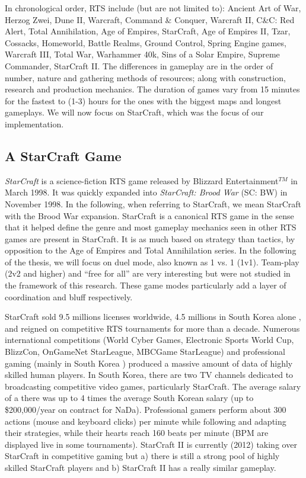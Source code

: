 In chronological order, RTS include (but are not limited to): Ancient Art of War, Herzog Zwei, Dune II, Warcraft, Command \& Conquer, Warcraft II, C\&C: Red Alert, Total Annihilation, Age of Empires, StarCraft, Age of Empires II, Tzar, Cossacks, Homeworld, Battle Realms, Ground Control, Spring Engine games, Warcraft III, Total War, Warhammer 40k, Sins of a Solar Empire, Supreme Commander, StarCraft II. The differences in gameplay are in the order of number, nature and gathering methods of resources; along with construction, research and production mechanics. The duration of games vary from 15 minutes for the fastest to (1-3) hours for the ones with the biggest maps and longest gameplays. We will now focus on StarCraft, which was the focus of our implementation.


\subsection{A StarCraft Game}
\textit{StarCraft} is a science-fiction RTS game released by Blizzard Entertainment$^{TM}$ in March 1998. It was quickly expanded into \textit{StarCraft: Brood War} (SC: BW) in November 1998. In the following, when referring to StarCraft, we mean StarCraft with the Brood War expansion. StarCraft is a canonical RTS game in the sense that it helped define the genre and most gameplay mechanics seen in other RTS games are present in StarCraft. It is as much based on strategy than tactics, by opposition to the Age of Empires and Total Annihilation series. In the following of the thesis, we will focus on duel mode, also known as 1 vs. 1 (1v1). Team-play (2v2 and higher) and ``free for all'' are very interesting but were not studied in the framework of this research. These game modes particularly add a layer of coordination and bluff respectively.


StarCraft sold 9.5 millions licenses worldwide, 4.5 millions in South Korea alone \citep{StarCraftNumbers}, and reigned on competitive RTS tournaments for more than a decade. Numerous international competitions (World Cyber Games, Electronic Sports World Cup, BlizzCon, OnGameNet StarLeague, MBCGame StarLeague) and professional gaming (mainly in South Korea \citep{Chee05}) produced a massive amount of data of highly skilled human players. In South Korea, there are two TV channels dedicated to broadcasting competitive video games, particularly StarCraft. The average salary of a  there was up to 4 times the average South Korean salary \citep{MYMPGM} (up to \$200,000/year on contract for NaDa). Professional gamers perform about 300 actions (mouse and keyboard clicks) per minute while following and adapting their strategies, while their hearts reach 160 beats per minute (BPM are displayed live in some tournaments). StarCraft II is currently (2012) taking over StarCraft in competitive gaming but a) there is still a strong pool of highly skilled StarCraft players and b) StarCraft II has a really similar gameplay.


